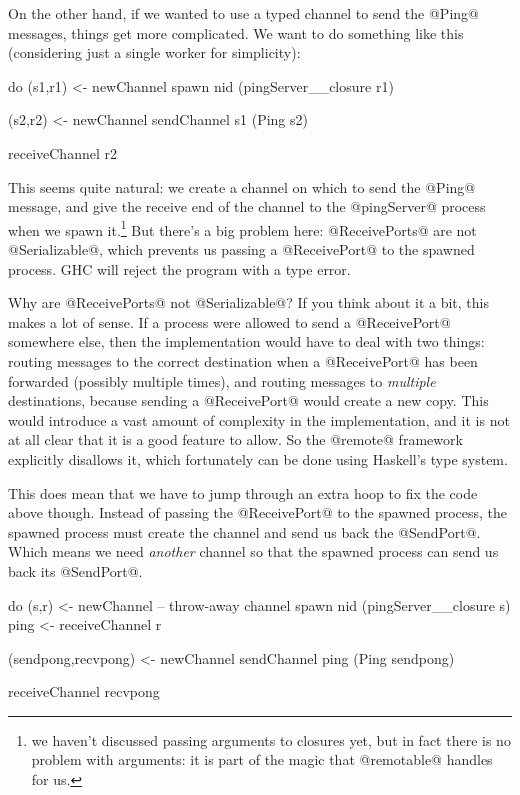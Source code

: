 On the other hand, if we wanted to use a typed channel to send the
@Ping@ messages, things get more complicated.  We want to do something
like this (considering just a single worker for simplicity):

\begin{haskell}
  do
    (s1,r1) <- newChannel
    spawn nid (pingServer__closure r1)

    (s2,r2) <- newChannel
    sendChannel s1 (Ping s2)

    receiveChannel r2
\end{haskell}

\noindent This seems quite natural: we create a channel on which to
send the @Ping@ message, and give the receive end of the channel to
the @pingServer@ process when we spawn it.\footnote{we haven't
  discussed passing arguments to closures yet, but in fact there is no
  problem with arguments: it is part of the magic that @remotable@
  handles for us.}  But there's a big problem here: @ReceivePorts@ are not
@Serializable@, which prevents us passing a @ReceivePort@ to the
spawned process.  GHC will reject the program with a type error.

Why are @ReceivePorts@ not @Serializable@?  If you think about it a
bit, this makes a lot of sense.  If a process were allowed to send a
@ReceivePort@ somewhere else, then the implementation would have to
deal with two things: routing messages to the correct destination when
a @ReceivePort@ has been forwarded (possibly multiple times), and
routing messages to \emph{multiple} destinations, because sending a
@ReceivePort@ would create a new copy.  This would introduce a vast
amount of complexity in the implementation, and it is not at all clear
that it is a good feature to allow.  So the @remote@ framework
explicitly disallows it, which fortunately can be done using Haskell's
type system.

This does mean that we have to jump through an extra hoop to fix the
code above though.  Instead of passing the @ReceivePort@ to the
spawned process, the spawned process must create the channel and send
us back the @SendPort@.  Which means we need \emph{another} channel so
that the spawned process can send us back its @SendPort@.

\begin{haskell}
  do
    (s,r) <- newChannel  -- throw-away channel
    spawn nid (pingServer__closure s)
    ping <- receiveChannel r

    (sendpong,recvpong) <- newChannel
    sendChannel ping (Ping sendpong)

    receiveChannel recvpong
\end{haskell}

